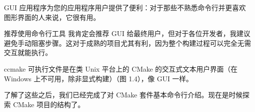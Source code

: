 
GUI 应用程序为您的应用程序用户提供了便利：对于那些不熟悉命令行并更喜欢图形界面的人来说，它很有用。

\begin{myNotic}{推荐使用命令行工具}
我肯定会推荐 GUI 给最终用户，但对于各位开发者，我建议避免手动阻塞步骤。这对于成熟的项目尤其有利，因为整个构建过程可以完全无需交互就能执行。
\end{myNotic}


ccmake 可执行文件是在类 Unix 平台上的 CMake 的交互式文本用户界面（在 Windows 上不可用，除非显式构建）（图 1.4），像 GUI 一样。


了解了这些之后，我们已经完成了对 CMake 套件基本命令行介绍。现在是时候探索 CMake 项目的结构了。

















